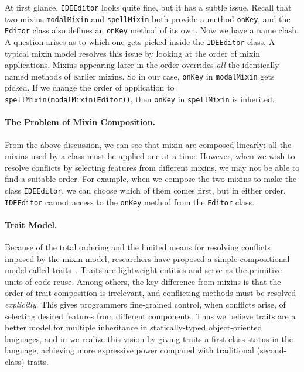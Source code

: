 At first glance, \lstinline{IDEEditor} looks quite fine, but it has a subtle
issue. Recall that two mixins \lstinline{modalMixin} and \lstinline{spellMixin}
both provide a method \lstinline{onKey}, and the \lstinline{Editor} class also
defines an \lstinline{onKey} method of its own. Now we have a name clash. A
question arises as to which one gets picked inside the \lstinline{IDEEditor}
class. A typical mixin model resolves this issue by looking at the order of mixin applications. Mixins appearing later in the order
overrides \emph{all} the identically named methods of earlier mixins. So in our
case, \lstinline{onKey} in \lstinline{modalMixin} gets picked. If we
change the order of application to \lstinline{spellMixin(modalMixin(Editor))},
then \lstinline{onKey} in \lstinline{spellMixin} is inherited.

\paragraph{The Problem of Mixin Composition.}
From the above discussion, we can see that mixin are composed linearly: all the
mixins used by a class must be applied one at a time. However, when we wish to
resolve conflicts by selecting features from different mixins, we may not be
able to find a suitable order. For example, when we compose the two mixins to
make the class \lstinline{IDEEditor}, we can choose which of them comes first,
but in either order, \lstinline{IDEEditor} cannot access to the \lstinline{onKey}
method from the \lstinline{Editor} class.

\paragraph{Trait Model.}
Because of the total ordering and the limited means for resolving conflicts imposed by the mixin model,
researchers have proposed a simple compositional model called
traits~\citep{scharli2003traits, Ducasse_2006}. Traits are lightweight entities and serve as
the primitive units of code reuse. Among others, the key difference from
mixins is that the order of trait composition is irrelevant, and conflicting
methods must be resolved \emph{explicitly}. This gives programmers
fine-grained control, when conflicts arise, of selecting desired features from
different components. Thus we believe traits are a better model for multiple
inheritance in statically-typed object-oriented languages, and in \sedel we realize this
vision by giving traits a first-class status in the language,
achieving more expressive power compared with traditional (second-class) traits.


